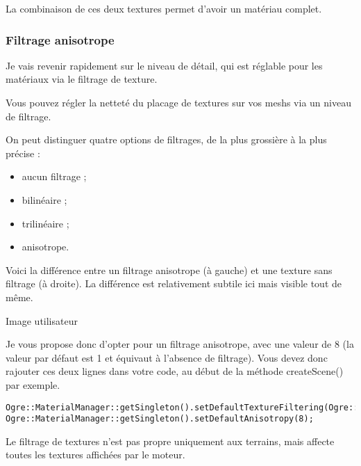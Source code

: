 La combinaison de ces deux textures permet d'avoir un mat\'eriau complet.



\subsubsection{Filtrage anisotrope}


Je vais revenir rapidement sur le niveau de d\'etail, qui est r\'eglable pour les mat\'eriaux via le filtrage de texture.

Vous pouvez r\'egler la nettet\'e du placage de textures sur vos meshs via un niveau de filtrage.

On peut distinguer quatre options de filtrages, de la plus grossi\`ere \`a la plus pr\'ecise :

\begin{itemize}
\item aucun filtrage ;
\item bilin\'eaire ;
\item trilin\'eaire ;
\item anisotrope.
\end{itemize}


Voici la diff\'erence entre un filtrage anisotrope (\`a gauche) et une texture sans filtrage (\`a droite). La diff\'erence est relativement subtile ici mais visible tout de m\^eme.

Image utilisateur

Je vous propose donc d'opter pour un filtrage anisotrope, avec une valeur de 8 (la valeur par d\'efaut est 1 et \'equivaut \`a l'absence de filtrage). Vous devez donc rajouter ces deux lignes dans votre code, au d\'ebut de la m\'ethode createScene() par exemple.

\begin{lstlisting}[caption={Choix d'un filtrage anisotrope}]
Ogre::MaterialManager::getSingleton().setDefaultTextureFiltering(Ogre::TFO\_ANISOTROPIC);
Ogre::MaterialManager::getSingleton().setDefaultAnisotropy(8);
\end{lstlisting}

Le filtrage de textures n'est pas propre uniquement aux terrains, mais affecte toutes les textures affich\'ees par le moteur.



